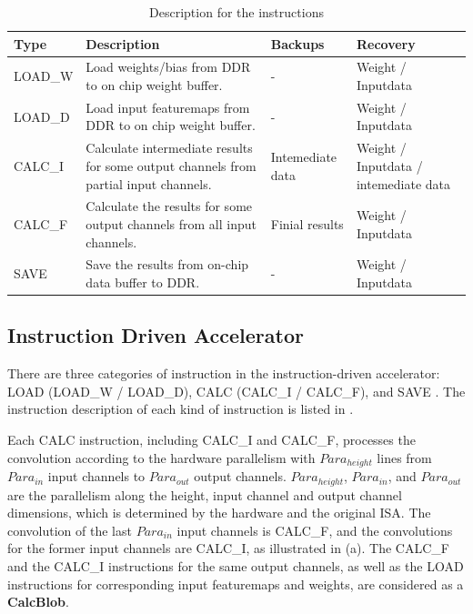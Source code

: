 \label{sec:cnninterrupt}


\begin{table}[t]
	\centering
	\scriptsize
	\caption{Description for the instructions}
\begin{tabular}{|p{4em}|p{12em}||p{6em}|p{6em}|}
	\hline
	Type & Description & Backups & Recovery \bigstrut\\
	\hline
	LOAD\_W & Load weights/bias from DDR to on chip weight buffer. & - & Weight / Inputdata \bigstrut\\
	\hline
	LOAD\_D & Load input featuremaps from DDR to on chip weight buffer. & - & Weight / Inputdata \bigstrut\\
	\hline
	CALC\_I & Calculate intermediate results for some output channels from partial input channels. &  Intemediate data & Weight / Inputdata / intemediate data \bigstrut\\
	\hline
	CALC\_F & Calculate the results for some output channels from all input channels. & Finial results & Weight / Inputdata \bigstrut\\
	\hline
	SAVE & Save the results from on-chip data buffer to DDR. & - & Weight / Inputdata \bigstrut\\
	\hline
	\end{tabular}%
	
	\label{tab:instr}%
 \end{table}%
 




\subsection{ Instruction Driven Accelerator }
\label{sec:instrAcc}
There are three categories of instruction in the instruction-driven accelerator: LOAD (LOAD\_W / LOAD\_D), CALC (CALC\_I / CALC\_F), and SAVE \cite{guo2017angel,qiu2016going,yu2018instruction}. The instruction description of each kind of instruction is listed in . 

Each CALC instruction, including CALC\_I and CALC\_F, processes the convolution according to the hardware parallelism with $Para_{height}$ lines from $ Para_{in} $ input channels to $ Para_{out}$ output channels. $Para_{height}$, $ Para_{in} $, and $ Para_{out} $ are the parallelism along the height, input channel and output channel dimensions, which is determined by the hardware and the original ISA. 
The convolution of the last $ Para_{in} $ input channels is CALC\_F, and the convolutions for the former input channels are CALC\_I, as illustrated in (a). The CALC\_F and the CALC\_I instructions for the same output channels, as well as the LOAD instructions for corresponding input featuremaps and weights, are considered as a \textbf{CalcBlob}.



